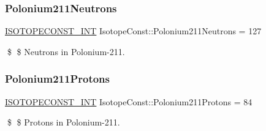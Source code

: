 \subsubsection{\texorpdfstring{Polonium211\+Neutrons}{Polonium211Neutrons}}
{\footnotesize\ttfamily \mbox{\hyperlink{group___isotope_const-_macros_ga5f18360b3e99483a35c32d789e62621c}{I\+S\+O\+T\+O\+P\+E\+C\+O\+N\+S\+T\+\_\+\+I\+NT}} Isotope\+Const\+::\+Polonium211\+Neutrons = 127}

\$ \$ Neutrons in Polonium-\/211. \mbox{\label{group___isotope_const-_polonium-_po211_gaa48a52725afc70d3381e64a88a63c3af}} 
\subsubsection{\texorpdfstring{Polonium211\+Protons}{Polonium211Protons}}
{\footnotesize\ttfamily \mbox{\hyperlink{group___isotope_const-_macros_ga5f18360b3e99483a35c32d789e62621c}{I\+S\+O\+T\+O\+P\+E\+C\+O\+N\+S\+T\+\_\+\+I\+NT}} Isotope\+Const\+::\+Polonium211\+Protons = 84}

\$ \$ Protons in Polonium-\/211. 